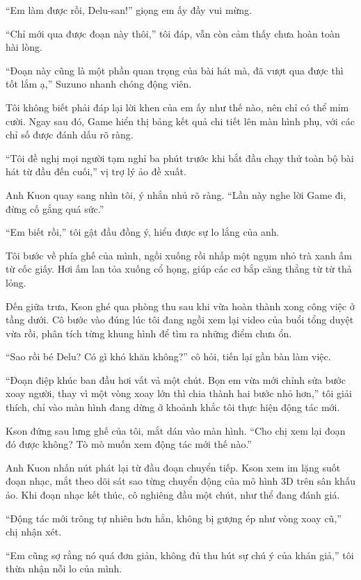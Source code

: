 ﻿\documentclass[../main.tex]{subfiles}
\begin{document}
``Em làm được rồi, Delu-san!'' giọng em ấy đầy vui mừng.

``Chỉ mới qua được đoạn này thôi,'' tôi đáp, vẫn còn cảm thấy chưa hoàn toàn hài lòng.

``Đoạn này cũng là một phần quan trọng của bài hát mà, đã vượt qua được thì tốt lắm ạ,'' Suzuno nhanh chóng động viên.

Tôi không biết phải đáp lại lời khen của em ấy như thế nào, nên chỉ có thể mỉm cười. Ngay sau đó, Game hiển thị bảng kết quả chi tiết lên màn hình phụ, với các chỉ số được đánh dấu rõ ràng.

``Tôi đề nghị mọi người tạm nghỉ ba phút trước khi bắt đầu chạy thử toàn bộ bài hát từ đầu đến cuối,'' vị trợ lý ảo đề xuất.

Anh Kuon quay sang nhìn tôi, ý nhắn nhủ rõ ràng. ``Lần này nghe lời Game đi, đừng cố gắng quá sức.''

``Em biết rồi,'' tôi gật đầu đồng ý, hiểu được sự lo lắng của anh.

Tôi bước về phía ghế của mình, ngồi xuống rồi nhấp một ngụm nhỏ trà xanh ấm từ cốc giấy. Hơi ấm lan tỏa xuống cổ họng, giúp các cơ bắp căng thẳng từ từ thả lỏng.

\ct

Đến giữa trưa, Kson ghé qua phòng thu sau khi vừa hoàn thành xong công việc ở tầng dưới. Cô bước vào đúng lúc tôi đang ngồi xem lại video của buổi tổng duyệt vừa rồi, phân tích từng khung hình để tìm ra những điểm chưa ổn.

``Sao rồi bé Delu? Có gì khó khăn không?'' cô hỏi, tiến lại gần bàn làm việc.

``Đoạn điệp khúc ban đầu hơi vất vả một chút. Bọn em vừa mới chỉnh sửa bước xoay người, thay vì một vòng xoay lớn thì chia thành hai bước nhỏ hơn,'' tôi giải thích, chỉ vào màn hình đang dừng ở khoảnh khắc tôi thực hiện động tác mới.

Kson đứng sau lưng ghế của tôi, mắt dán vào màn hình. ``Cho chị xem lại đoạn đó được không? Tò mò muốn xem động tác mới thế nào.''

Anh Kuon nhấn nút phát lại từ đầu đoạn chuyển tiếp. Kson xem im lặng suốt đoạn nhạc, mắt theo dõi sát sao từng chuyển động của mô hình 3D trên sân khấu ảo. Khi đoạn nhạc kết thúc, cô nghiêng đầu một chút, như thể đang đánh giá.

``Động tác mới trông tự nhiên hơn hẳn, không bị gượng ép như vòng xoay cũ,'' chị nhận xét.

``Em cũng sợ rằng nó quá đơn giản, không đủ thu hút sự chú ý của khán giả,'' tôi thừa nhận nỗi lo của mình.
\end{document}
